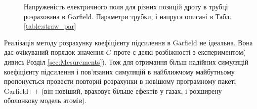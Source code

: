 \documentclass[pdftex,14pt]{scrartcl}
\begin{document}
	\begin{figure}[!h] 
		\centering
		\qquad
		\caption{ Напруженість електричного поля для різних позицій дроту в трубці розрахована в Garfield. Параметри трубки, і напруга описані в Табл.\ref{table:straw_par}}
	\end{figure}
	
	Реалізація методу розрахунку коефіцієнту підсилення в Garfield не ідеальна. Вона дає очікуваний порядок значення $G$ проте є деякі розбіжності з експериментом( дивись Розділ \ref{sec:Mesurements}). Тож для отримання більш надійних симуляцій коефіцієнту підсилення і пов'язаних симуляцій в найближчому майбутньому пропонується провести повторні розрахунки в новішому програмному пакеті Garfield++ \cite{garfieldpp} (він новіший, враховує більше ефектів у газах, і розширену оболонкову модель атомів).
	
	
\end{document}
